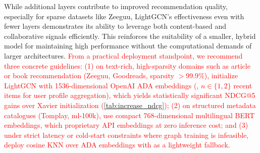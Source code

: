 While additional layers contribute to improved recommendation quality, especially for sparse datasets like Zeeguu, LightGCN's effectiveness even with fewer layers demonstrates its ability to leverage both content-based and collaborative signals efficiently. This reinforces the suitability of a smaller, hybrid model for maintaining high performance without the computational demands of larger architectures. \textcolor{red}{From a practical deployment standpoint, we recommend three concrete guidelines: (1) on text-rich, high-sparsity domains such as article or book recommendation (Zeeguu, Goodreads, sparsity $>99.9\%$), initialize LightGCN with 1536-dimensional OpenAI ADA embeddings (, $n \in \{1, 2\}$ recent items for user profile aggregation), which yields statistically significant NDCG@5 gains over Xavier initialization (\autoref{tab:increase_ndcg}); (2) on structured metadata catalogues (Tomplay, ml-100k), use compact 768-dimensional multilingual BERT embeddings, which  proprietary API embeddings  at zero inference cost; and (3) under strict latency or cold-start constraints where graph training is infeasible, deploy cosine KNN over ADA embeddings with  as a lightweight fallback.}